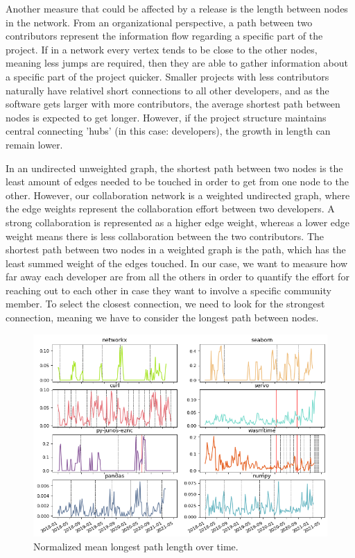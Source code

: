 Another measure that could be affected by a release is the length between nodes in the network. From an organizational perspective, a path between two contributors represent the information flow regarding a specific part of the project. If in a network every vertex tends to be close to the other nodes, meaning less jumps are required, then they are able to gather information about a specific part of the project quicker. Smaller projects with less contributors naturally have relativel short connections to all other developers, and as the software gets larger with more contributors, the average shortest path between nodes is expected to get longer. However, if the project structure maintains central connecting 'hubs' (in this case: developers), the growth in length can remain lower.

In an undirected unweighted graph, the shortest path between two nodes is the least amount of edges needed to be touched in order to get from one node to the other. However, our collaboration network is a weighted undirected graph, where the edge weights represent the collaboration effort between two developers. A strong collaboration is represented as a higher edge weight, whereas a lower edge weight means there is less collaboration between the two contributors. The shortest path between two nodes in a weighted graph is the path, which has the least summed weight of the edges touched. In our case, we want to measure how far away each developer are from all the others in order to quantify the effort for reaching out to each other in case they want to involve a specific community member. To select the closest connection, we need to look for the strongest connection, meaning we have to consider the longest path between nodes.

\begin{figure}
    \centering
    \includegraphics[width=\textwidth]{figures/qualitative/mean_path_length/path_length_all_normalized.png}
    \caption{Normalized mean longest path length over time.}
    \label{fig:mean_path}
\end{figure}

